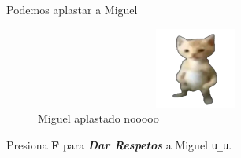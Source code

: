\documentclass[12pt]{article}
\begin{document}
    Podemos aplastar a Miguel

    \begin{figure}[h]
        \centering

        \includegraphics[width=400px, height=100px]{miguel.png}

        \caption{Miguel aplastado nooooo}
    \end{figure}

    Presiona \textbf{F} para \textit{\textbf{Dar Respetos}} a Miguel \texttt{u\_u}.
\end{document}
